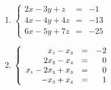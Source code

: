 \documentclass{ximera}
\begin{document}
\begin{multicols}{2}
\begin{enumerate}
\setcounter{enumi}{\value{HW}}


\item $\left\{ \begin{array}{rcr} 2x-3y+z & = & -1 \\ 4x-4y+4z & = & -13 \\ 6x-5y+7z & = & -25  \end{array} \right.$

\item  $\left\{ \begin{array}{rcr} x_{\mbox{\tiny$1$}} - x_{\mbox{\tiny$3$}} & = & -2 \\ 
2x_{\mbox{\tiny$2$}} - x_{\mbox{\tiny$4$}} & = & 0  \\  
x_{\mbox{\tiny$1$}} -  2x_{\mbox{\tiny$2$}} + x_{\mbox{\tiny$3$}} & = & 0 \\
-x_{\mbox{\tiny$3$}} + x_{\mbox{\tiny$4$}} & = & 1  \end{array} \right.$ \label{solveauglast}

\setcounter{HW}{\value{enumi}}
\end{enumerate}
\end{multicols}
\end{document}

